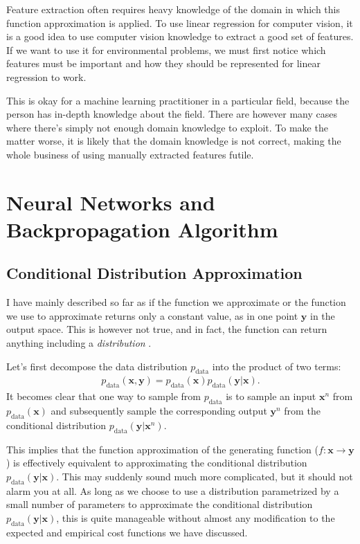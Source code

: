 \documentclass{report}
\newcommand{\vect}[1]{\mathbf{#1}}
\newcommand{\vx}[0]{\vect{x}}
\newcommand{\vy}[0]{\vect{y}}
\newcommand{\data}{\text{data}}
\begin{document}
Feature extraction often requires heavy knowledge of the domain in which this
function approximation is applied. To use linear regression for computer vision,
it is a good idea to use computer vision knowledge to extract a good set of
features. If we want to use it for environmental problems, we must first notice
which features must be important and how they should be represented for linear
regression to work. 

This is okay for a machine learning practitioner in a particular field, because
the person has in-depth knowledge about the field. There are however many cases
where there's simply not enough domain knowledge to exploit. To make the matter
worse, it is likely that the domain knowledge is not correct, making the whole
business of using manually extracted features futile.

\chapter{Neural Networks and Backpropagation Algorithm}
\label{chap:nn}

\section{Conditional Distribution Approximation}
\label{sec:distribution_approx}

I have mainly described so far as if the function we approximate or the function
we use to approximate returns only a constant value, as in one point $\vy$ in
the output space. This is however not true, and in fact, the function can return
anything including a {\em
distribution} \citep{Bridle1990,denker1991transforming,bishop1994mixture}.

Let's first decompose the data distribution $p_{\data}$ into the product
of two terms:
\begin{align*}
    p_{\data}(\vx, \vy) = p_{\data}(\vx) p_{\data}(\vy |\vx).
\end{align*}
It becomes clear that one way to sample from $p_{\data}$ is to sample an input
$\vx^n$ from $p_{\data}(\vx)$ and subsequently sample the corresponding output
$\vy^n$ from the conditional distribution $p_{\data}(\vy | \vx^n)$. 

This implies that the function approximation of the generating function ($f:
\vx \to \vy$) is effectively equivalent to approximating the conditional
distribution $p_{\data}(\vy | \vx)$. This may suddenly sound much more
complicated, but it should not alarm you at all.  As long as we choose to use a
distribution parametrized by a small number of parameters to approximate the
conditional distribution $p_{\data}(\vy | \vx)$, this is quite manageable
without almost any modification to the expected and empirical cost functions we
have discussed. 
\end{document}
